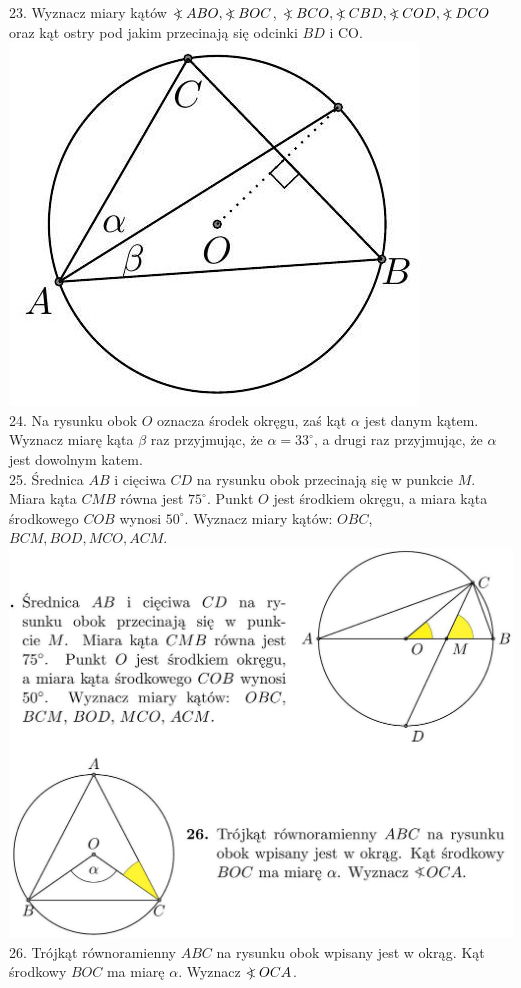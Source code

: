 \documentclass[10pt]{article}
\newcommand\Varangle{\mathop{{<\!\!\!\!\!\text{\small)}}\:}\nolimits}
\begin{document}
23. Wyznacz miary kątów \(\Varangle A B O, \Varangle B O C\), \(\Varangle B C O, \Varangle C B D, \Varangle C O D, \Varangle D C O\) oraz kąt ostry pod jakim przecinają się odcinki \(B D\) i CO.\\
\includegraphics[max width=\textwidth, center]{2024_11_21_71f62bd117d375398909g-186}\\
24. Na rysunku obok \(O\) oznacza środek okręgu, zaś kąt \(\alpha\) jest danym kątem. Wyznacz miarę kąta \(\beta\) raz przyjmując, że \(\alpha=33^{\circ}\), a drugi raz przyjmując, że \(\alpha\) jest dowolnym katem.\\
25. Średnica \(A B\) i cięciwa \(C D\) na rysunku obok przecinają się w punkcie \(M\). Miara kąta \(C M B\) równa jest \(75^{\circ}\). Punkt \(O\) jest środkiem okręgu, a miara kąta środkowego \(C O B\) wynosi \(50^{\circ}\). Wyznacz miary kątów: \(O B C\), \(B C M, B O D, M C O, A C M\).\\
\includegraphics[max width=\textwidth, center]{2024_11_21_71f62bd117d375398909g-186(1)}\\
26. Trójkąt równoramienny \(A B C\) na rysunku obok wpisany jest w okrąg. Kąt środkowy \(B O C\) ma miarę \(\alpha\). Wyznacz \(\Varangle O C A\).
\end{document}
